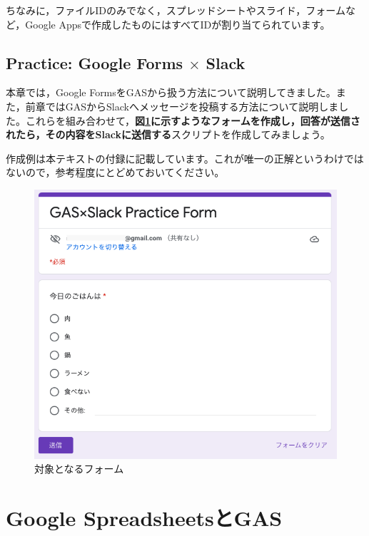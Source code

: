 \documentclass[uplatex,a4j]{jsarticle}
\begin{document}
ちなみに，ファイルIDのみでなく，スプレッドシートやスライド，フォームなど，Google Appsで作成したものにはすべてIDが割り当てられています。

\clearpage

\subsection{Practice: Google Forms $\times$ Slack}

本章では，Google FormsをGASから扱う方法について説明してきました。また，前章ではGASからSlackへメッセージを投稿する方法について説明しました。これらを組み合わせて，\textbf{図\ref{fig:practice_form}に示すようなフォームを作成し，回答が送信されたら，その内容をSlackに送信する}スクリプトを作成してみましょう。

作成例は本テキストの付録に記載しています。これが唯一の正解というわけではないので，参考程度にとどめておいてください。

\begin{figure}[H]
 \centering
 \includegraphics[keepaspectratio, scale=0.5]{images/practice_form.png}
 \caption{対象となるフォーム}
 \label{fig:practice_form}
\end{figure}

\clearpage

\section{Google SpreadsheetsとGAS}
\end{document}
